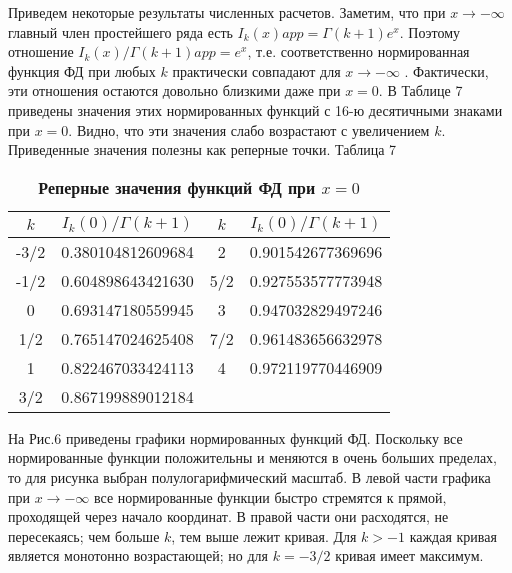 Приведем некоторые результаты численных расчетов. Заметим, что при
$x \to -\infty$ главный член простейшего ряда есть $I_k(x)app=\Gamma(k+1)e^x$. Поэтому отношение $I_k(x)/\Gamma(k+1)app= e^x$, т.е. соответственно нормированная функция ФД
при любых $k$ практически совпадают для $x \to -\infty$ . Фактически, эти отношения
остаются довольно близкими даже при $x = 0$. В Таблице 7 приведены значения
этих нормированных функций с 16-ю десятичными знаками при $x = 0$. Видно,
что эти значения слабо возрастают с увеличением $k$. Приведенные значения
полезны как реперные точки.
Таблица 7
\begin{table}[]
\caption{\textbf{Реперные значения функций ФД при $x = 0$}}
\begin{center}
\begin{tabular}{|c|c|c|c|}
\hline
$k$ & $I_k(0)/\Gamma(k+1)$ & $k$ & $I_k(0)/\Gamma(k+1)$ \\
\hline
-3/2 & 0.380104812609684 & 2 & 0.901542677369696 \\
-1/2 & 0.604898643421630 & 5/2 & 0.927553577773948 \\
0 & 0.693147180559945 & 3 & 0.947032829497246 \\
1/2 & 0.765147024625408 & 7/2 & 0.961483656632978 \\
1 & 0.822467033424113 & 4 & 0.972119770446909 \\
3/2 & 0.867199889012184 & & \\
\hline
\end{tabular}
\end{center}
\end{table}

На Рис.6 приведены графики нормированных функций ФД. Поскольку все
нормированные функции положительны и меняются в очень больших пределах,
то для рисунка выбран полулогарифмический масштаб. В левой части графика
при $x \to -\infty$ все нормированные функции быстро стремятся к прямой,
проходящей через начало координат. В правой части они расходятся, не
пересекаясь; чем больше $k$, тем выше лежит кривая. Для $k > -1$ каждая кривая
является монотонно возрастающей; но для $k = -3/2$ кривая имеет максимум.
